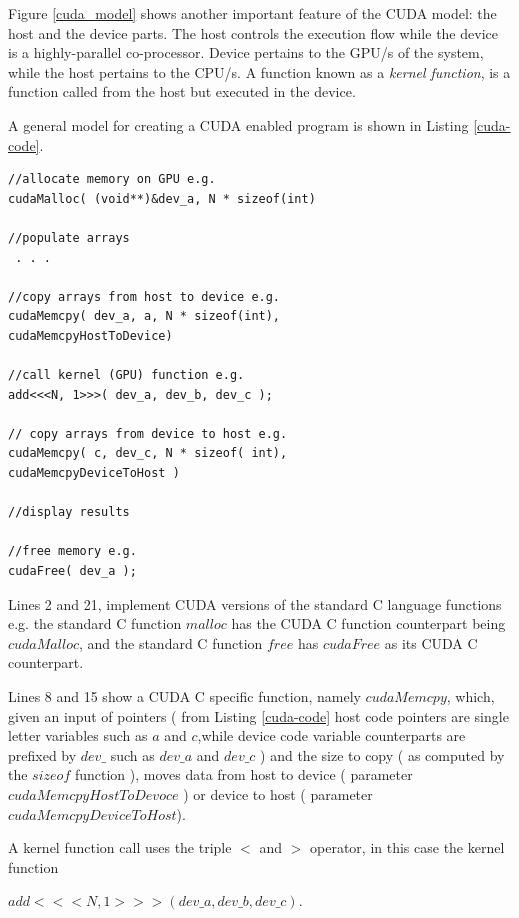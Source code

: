 \documentclass{svmultm}
\begin{document}
Figure \ref{cuda_model} shows another important feature of the CUDA model:
the host and the device parts. {The host controls the execution flow while the device
is a highly-parallel co-processor.}
Device pertains to the  {GPU}/s of the system, while the host
pertains to the CPU/s. A function known as a \textit{kernel
function}, is a function called from the host but executed in
the device.

A general model for creating a CUDA enabled program is
shown in Listing \ref{cuda-code}.


\lstset{numbers=left, numberstyle=\tiny, stepnumber=1, numbersep=5pt, label=cuda_gencode}


\begin{lstlisting}[label=cuda-code,caption=General code flow for CUDA programming written in the CUDA extended C language]
//allocate memory on GPU e.g.
cudaMalloc( (void**)&dev_a, N * sizeof(int)

//populate arrays
 . . .

//copy arrays from host to device e.g.
cudaMemcpy( dev_a, a, N * sizeof(int), 
cudaMemcpyHostToDevice)

//call kernel (GPU) function e.g.
add<<<N, 1>>>( dev_a, dev_b, dev_c );

// copy arrays from device to host e.g.
cudaMemcpy( c, dev_c, N * sizeof( int), 
cudaMemcpyDeviceToHost )

//display results

//free memory e.g.
cudaFree( dev_a );
\end{lstlisting}

Lines 2 and 21, implement CUDA versions of
the standard C language functions e.g. the standard C
function $malloc$ has the CUDA C function counterpart being
$cudaMalloc$, and the standard C function $free$ has $cudaFree$ as its CUDA C counterpart.

Lines 8 and 15 show a CUDA C specific function, namely
$cudaMemcpy$, which, given an input of pointers ( from Listing \ref{cuda-code} host code
pointers are single letter variables such as $a$ and $c$,while
device code variable counterparts are prefixed by $dev\_$ such
as $dev\_a$ and $dev\_c$ ) and the size to copy ( as computed by
the $sizeof$ function ), moves data from host to device
( parameter $cudaMemcpyHostToDevoce$ ) or device to host
( parameter $cudaMemcpyDeviceToHost$).

A kernel function call uses the {triple $<$ and $>$} operator, in
this case the kernel function 

{$add< < < N, 1 > > >$}$( dev\_a, dev\_b,
dev\_c )$.
\end{document}
